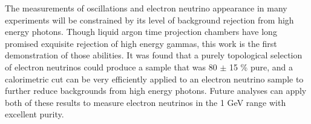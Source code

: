 The measurements of oscillations and electron neutrino appearance in many experiments will be constrained by its level of background rejection from high energy photons.  Though liquid argon time projection chambers have long promised exquisite rejection of high energy gammas, this work is the first demonstration of those abilities.  It was found that a purely topological selection of electron neutrinos could produce a sample that was 80 $\pm$ 15 \% pure, and a calorimetric cut can be very efficiently applied to an electron neutrino sample to further reduce backgrounds from high energy photons.  Future analyses can apply both of these results to measure electron neutrinos in the 1 GeV range with excellent purity.